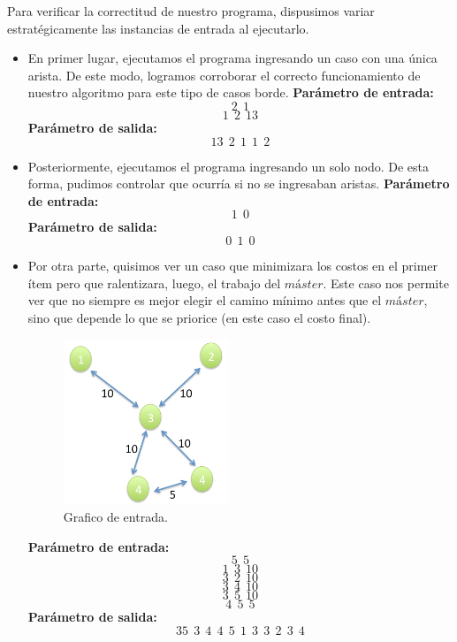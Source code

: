 Para verificar la correctitud de nuestro programa, dispusimos variar estratégicamente las instancias de entrada al ejecutarlo.
\begin{itemize}
\item En primer lugar, ejecutamos el programa ingresando un caso con una única arista. De este modo, logramos corroborar el correcto funcionamiento de nuestro algoritmo para este tipo de casos borde.\newline
\textbf{Parámetro de entrada:} $$2\ \ 1 $$
$$1\ \ 2\ \ 13 $$
\textbf{Parámetro de salida:} $$13\ \ 2\ \ 1\ \ 1\ \ 2$$

\item Posteriormente, ejecutamos el programa ingresando un solo nodo. De esta forma, pudimos controlar que ocurría si no se ingresaban aristas.\newline
\textbf{Parámetro de entrada:} $$1\ \ 0 $$
\textbf{Parámetro de salida:} $$0\ \ 1\ \ 0$$

\item Por otra parte, quisimos ver un caso que minimizara los costos en el primer ítem pero que ralentizara, luego, el trabajo del $máster$. Este caso nos permite ver que no siempre es mejor elegir el camino mínimo antes que el $máster$, sino que depende lo que se priorice (en este caso el costo final).\newline
\begin{figure}[H] %
\begin{center}
\includegraphics[width=140pt]{../imgs/caso1-ej2.png}
\end{center}
\caption{Grafico de entrada.}
\end{figure}
\textbf{Parámetro de entrada:} $$5\ \ 5$$
$$1\ \ 3\ \ 10$$
$$3\ \ 2\ \ 10$$
$$3\ \  4\ \  10$$
$$3\ \  5\ \  10$$
$$4\ \  5\ \  5$$
\textbf{Parámetro de salida:} $$35\ \ 3\ \ 4\ \ 4\ \ 5\ \ 1\ \ 3\ \ 3\ \ 2\ \ 3\ \ 4 $$


\end{itemize}
